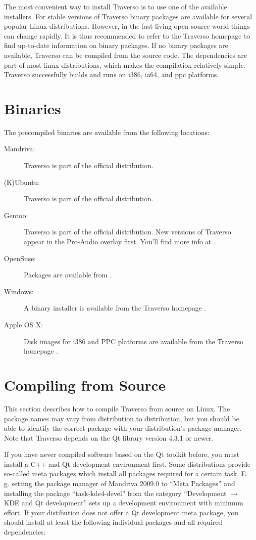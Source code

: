 The most convenient way to install Traverso is to use one of the available installers. For stable versions of Traverso binary packages are available for several popular Linux distributions. However, in the fast-living open source world things can change rapidly. It is thus recommended to refer to the Traverso homepage \cite{trav-hp} to find up-to-date information on binary packages. If no binary packages are available, Traverso can be compiled from the source code. The dependencies are part of most linux distributions, which makes the compilation relatively simple. Traverso successfully builds and runs on i386, ia64, and ppc platforms.

\section{Binaries}
The precompiled binaries are available from the following locations:

\begin{description}
	\item [Mandriva:] Traverso is part of the official distribution.
	\item [(K)Ubuntu:] Traverso is part of the official distribution.
	\item [Gentoo:] Traverso is part of the official distribution. New versions of Traverso appear in the Pro-Audio overlay first. You'll find more info at \cite{pro-audio-wiki}.
	\item [OpenSuse:] Packages are available from \cite{suse-ref}.
	\item [Windows:] A binary installer is available from the Traverso homepage \cite{trav-hp}.
	\item [Apple OS X:] Disk images for i386 and PPC platforms are available from the Traverso homepage \cite{trav-hp}.
\end{description}

\section{Compiling from Source}
This section describes how to compile Traverso from source on Linux. The package names may vary from distribution to distribution, but you should be able to identify the correct package with your distribution's package manager. Note that Traverso depends on the Qt library version 4.3.1 or newer.

If you have never compiled software based on the Qt toolkit before, you must install a C++ and Qt development environment first. Some distributions provide so-called meta packages which install all packages required for a certain task. E.\,g. setting the package manager of Mandriva 2009.0 to ``Meta Packages'' and installing the package ``task-kde4-devel'' from the category ``Development $\rightarrow$ KDE and Qt development'' sets up a development environment with minimum effort. If your distibution does not offer a Qt development meta package, you should install at least the following individual packages and all required dependencies:

